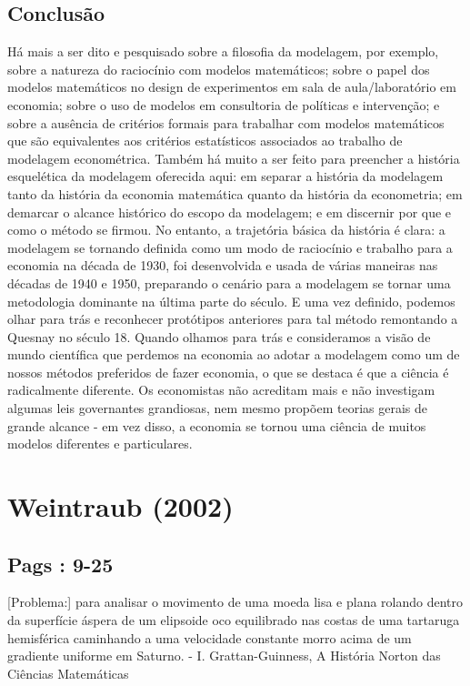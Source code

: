 \documentclass[12pt]{article}
\begin{document}
\subsection{\textbf{Conclusão}}
Há mais a ser dito e pesquisado sobre a filosofia da modelagem, por exemplo, sobre a natureza do raciocínio com modelos matemáticos; sobre o papel dos modelos matemáticos no design de experimentos em sala de aula/laboratório em economia; sobre o uso de modelos em consultoria de políticas e intervenção; e sobre a ausência de critérios formais para trabalhar com modelos matemáticos que são equivalentes aos critérios estatísticos associados ao trabalho de modelagem econométrica. Também há muito a ser feito para preencher a história esquelética da modelagem oferecida aqui: em separar a história da modelagem tanto da história da economia matemática quanto da história da econometria; em demarcar o alcance histórico do escopo da modelagem; e em discernir por que e como o método se firmou. No entanto, a trajetória básica da história é clara: a modelagem se tornando definida como um modo de raciocínio e trabalho para a economia na década de 1930, foi desenvolvida e usada de várias maneiras nas décadas de 1940 e 1950, preparando o cenário para a modelagem se tornar uma metodologia dominante na última parte do século. E uma vez definido, podemos olhar para trás e reconhecer protótipos anteriores para tal método remontando a Quesnay no século 18. Quando olhamos para trás e consideramos a visão de mundo científica que perdemos na economia ao adotar a modelagem como um de nossos métodos preferidos de fazer economia, o que se destaca é que a ciência é radicalmente diferente. Os economistas não acreditam mais e não investigam algumas leis governantes grandiosas, nem mesmo propõem teorias gerais de grande alcance - em vez disso, a economia se tornou uma ciência de muitos modelos diferentes e particulares.

\section{\textbf{Weintraub (2002)}}
\subsection{\textbf{Pags : 9-25}}
[Problema:] para analisar o movimento de uma moeda lisa e plana rolando dentro da superfície áspera de um elipsoide oco equilibrado nas costas de uma tartaruga hemisférica caminhando a uma velocidade constante morro acima de um gradiente uniforme em Saturno.
- I. Grattan-Guinness, A História Norton das Ciências Matemáticas
\end{document}
